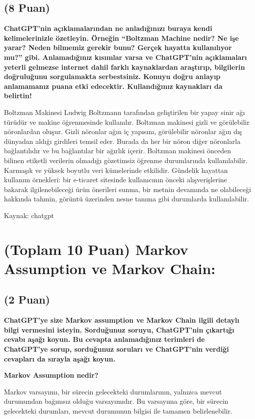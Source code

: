 \documentclass[11pt]{article}
\begin{document}
\subsection{(8 Puan)} \textbf{ChatGPT’nin açıklamalarından ne anladığınızı buraya kendi kelimelerinizle özetleyin. Örneğin ``Boltzman Machine nedir? Ne işe yarar? Neden bilmemiz gerekir bunu? Gerçek hayatta kullanılıyor mu?'' gibi. Anlamadığınız kısımlar varsa ve ChatGPT’nin açıklamaları yeterli gelmezse internet dahil farklı kaynaklardan araştırıp, bilgilerin doğruluğunu sorgulamakta serbestsiniz. Konuyu doğru anlayıp anlamamanız puana etki edecektir. Kullandığınız kaynakları da belirtin!}

Boltzman Makinesi Ludwig Boltzmann tarafından geliştirilen bir yapay sinir ağı türüdür ve makine öğrenmesinde kullanılır. Boltzman makinesi gizli ve görülebilir nöronlardan oluşur. Gizli nöronlar ağın iç yapısını, görülebilir nöronlar ağın dış dünyadan aldığı girdileri temsil eder. Burada da her bir nöron diğer nöronlarla bağlantılıdır ve bu bağlantılar bir ağırlık içerir. Boltzman makinesi önceden bilinen etiketli verilerin olmadığı gözetimsiz öğrenme durumlarında kullanılabilir. Karmaşık ve yüksek boyutlu veri kümelerinde etkilidir. Gündelik hayattan kullanım örnekleri: bir e-ticaret sitesinde kullanıcının önceki alışverişlerine bakarak ilgilenebileceği ürün önerileri sunma, bir metnin devamında ne olabileceği hakkında tahmin, görüntü üzerinden nesne tanıma gibi durumlarda kullanılabilir.

Kaynak: chatgpt

\section{(Toplam 10 Puan) Markov Assumption ve Markov Chain:}

\subsection{(2 Puan)} \textbf{ChatGPT’ye size Markov assumption ve Markov Chain ilgili detaylı bilgi vermesini isteyin. Sorduğunuz soruyu, ChatGPT'nin çıkartığı cevabı aşağı koyun. Bu cevapta anlamadığınız terimleri de ChatGPT’ye sorup, sorduğunuz soruları ve ChatGPT’nin verdiği cevapları da sırayla aşağı koyun.}

\textbf{ Markov Assumption nedir?}

Markov varsayımı, bir sürecin gelecekteki durumlarının, yalnızca mevcut durumundan bağımsız olduğu varsayımıdır. Bu varsayıma göre, bir sürecin gelecekteki durumları, mevcut durumunun bilgisi ile tamamen belirlenebilir.
\end{document}
